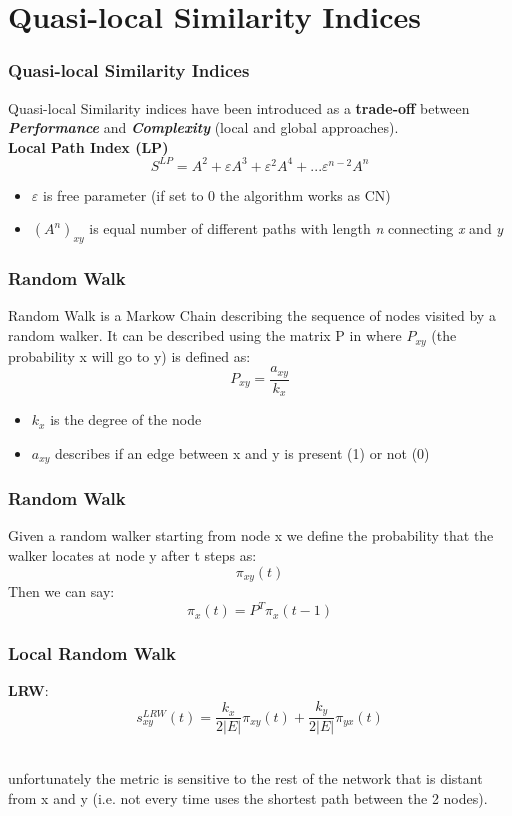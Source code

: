 \documentclass{beamer}
\begin{document}
\section{Quasi-local Similarity Indices}
\begin{frame}
  \frametitle{Quasi-local Similarity Indices}
Quasi-local Similarity indices have been introduced as a \textbf{trade-off} between  \emph{\textbf{Performance}} and \emph{\textbf{Complexity}} (local and global approaches). \\
\bigskip
  \textbf{Local Path Index (LP)}
  \[S^{LP} = A^{2} + \varepsilon A^{3} + \varepsilon^{2} A^{4} + ... \varepsilon^{n-2} A^{n}\]
  \begin{itemize}
      \item $\varepsilon$ is free parameter (if set to 0 the algorithm works as CN)\\
      \item $(A^{n})_{xy}$ is equal number of different paths with length \emph{n} connecting \emph{x} and \emph{y}\\
  \end{itemize} 
\end{frame}

\begin{frame}
  \frametitle{Random Walk }
  Random Walk is a Markow Chain describing the sequence of nodes visited by a random walker. It can be described using the matrix P in where $P_{xy}$ (the probability x will go to y) is defined as: \\
  \[P_{xy}=\dfrac{a_{xy}}{k_{x}}\] 
  \begin{itemize}
      \item $k_{x}$ is the degree of the node 
      \item $a_{xy}$ describes if an edge between x and y is present (1) or not (0)
  \end{itemize}
\end{frame}

\begin{frame}
  \frametitle{Random Walk}
  Given a random walker starting from node x we define the probability that the walker locates at node y after t steps as: \\
  \[\pi_{xy}(t)\]
  \bigskip
  Then we can say: 
  \[\pi_{x}(t)=P^{T}\pi_{x}(t-1)\]
  
\end{frame}

\begin{frame}
  \frametitle{Local Random Walk}
  \textbf{LRW}: \\
  \[s_{xy}^{LRW}(t) =\dfrac{k_{x}}{2|E|}\pi_{xy}(t) + \dfrac{k_{y}}{2|E|}\pi_{yx}(t)\]\\
  \bigskip
  \bigskip
  
  \color{red}\color{black} unfortunately the metric is sensitive to the rest of the network that is distant from x and y (i.e. not every time uses the shortest path between the 2 nodes).\\
\end{frame}
\end{document}
